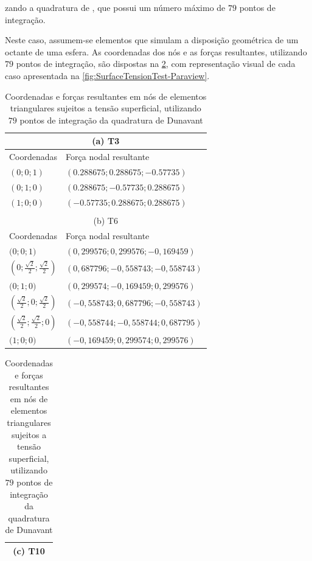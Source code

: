 \documentclass[Tese.tex]{subfiles}
\begin{document}
zando a quadratura de , que possui um número máximo de $79$ pontos de integração.

Neste caso, assumem-se elementos que simulam a disposição geométrica de um octante de uma esfera. As coordenadas dos nós e as forças resultantes, utilizando $79$ pontos de integração, são dispostas na \cref{tab:SurfaceTensionTest-nodes-2}, com representação visual de cada caso apresentada na \cref{fig:SurfaceTensionTest-Paraview}.

\begin{table}[!htb]
	\centering
	\caption{Coordenadas e forças resultantes em nós de elementos triangulares sujeitos a tensão superficial, utilizando $79$ pontos de integração da quadratura de Dunavant}
	\scriptsize
	\label{tab:SurfaceTensionTest-nodes-2}
	{\def\arraystretch{2}
		\begin{tabular}{ll}
			\multicolumn{2}{c}{(a) T3} \\ \hline
			Coordenadas & Força nodal resultante \\ \hline
			$\left(0; 0; 1\right)$  & $\left(0.288675; 0.288675; -0.57735\right)$  \\
			$\left(0; 1; 0\right)$ & $\left(0.288675; -0.57735; 0.288675\right)$ \\
			$\left(1; 0; 0\right)$ & $\left(-0.57735; 0.288675; 0.288675\right)$ \\ \hline
			& \\[-0.5cm]
			\multicolumn{2}{c}{(b) T6} \\ \hline
			Coordenadas & Força nodal resultante \\ \hline
			$\Big(0; 0; 1\Big)$ & $\left(0,299576; 0,299576; -0,169459\right)$ \\
			$\left(0; \frac{\sqrt{2}}{2}; \frac{\sqrt{2}}{2}\right)$ & $\left(0,687796; -0,558743; -0,558743\right)$ \\
			$\Big(0; 1; 0\Big)$ & $\left(0,299574; -0,169459; 0,299576\right)$ \\
			$\left(\frac{\sqrt{2}}{2}; 0; \frac{\sqrt{2}}{2}\right)$ & $\left(-0,558743; 0,687796; -0,558743\right)$ \\
			$\left(\frac{\sqrt{2}}{2}; \frac{\sqrt{2}}{2}; 0\right)$ & $\left(-0,558744; -0,558744; 0,687795\right)$ \\
			$\Big(1; 0; 0\Big)$ & $\left(-0,169459; 0,299574; 0,299576\right)$ \\ \hline
		\end{tabular}\qquad
		\begin{tabular}{ll}
			\multicolumn{2}{c}{(c) T10} \\ \hline

\end{tabular}}
\end{table}
\end{document}
